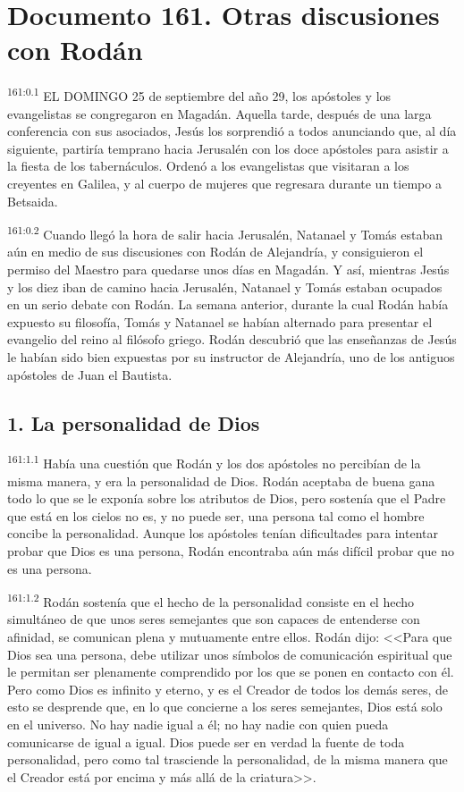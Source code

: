 \chapter{Documento 161. Otras discusiones con Rodán}
\par 
\textsuperscript{161:0.1} EL DOMINGO 25 de septiembre del año 29, los apóstoles y los evangelistas se congregaron en Magadán. Aquella tarde, después de una larga conferencia con sus asociados, Jesús los sorprendió a todos anunciando que, al día siguiente, partiría temprano hacia Jerusalén con los doce apóstoles para asistir a la fiesta de los tabernáculos. Ordenó a los evangelistas que visitaran a los creyentes en Galilea, y al cuerpo de mujeres que regresara durante un tiempo a Betsaida.

\par 
\textsuperscript{161:0.2} Cuando llegó la hora de salir hacia Jerusalén, Natanael y Tomás estaban aún en medio de sus discusiones con Rodán de Alejandría, y consiguieron el permiso del Maestro para quedarse unos días en Magadán. Y así, mientras Jesús y los diez iban de camino hacia Jerusalén, Natanael y Tomás estaban ocupados en un serio debate con Rodán. La semana anterior, durante la cual Rodán había expuesto su filosofía, Tomás y Natanael se habían alternado para presentar el evangelio del reino al filósofo griego. Rodán descubrió que las enseñanzas de Jesús le habían sido bien expuestas por su instructor de Alejandría, uno de los antiguos apóstoles de Juan el Bautista.

\section*{1. La personalidad de Dios}
\par 
\textsuperscript{161:1.1} Había una cuestión que Rodán y los dos apóstoles no percibían de la misma manera, y era la personalidad de Dios. Rodán aceptaba de buena gana todo lo que se le exponía sobre los atributos de Dios, pero sostenía que el Padre que está en los cielos no es, y no puede ser, una persona tal como el hombre concibe la personalidad. Aunque los apóstoles tenían dificultades para intentar probar que Dios es una persona, Rodán encontraba aún más difícil probar que no es una persona.

\par 
\textsuperscript{161:1.2} Rodán sostenía que el hecho de la personalidad consiste en el hecho simultáneo de que unos seres semejantes que son capaces de entenderse con afinidad, se comunican plena y mutuamente entre ellos. Rodán dijo: <<Para que Dios sea una persona, debe utilizar unos símbolos de comunicación espiritual que le permitan ser plenamente comprendido por los que se ponen en contacto con él. Pero como Dios es infinito y eterno, y es el Creador de todos los demás seres, de esto se desprende que, en lo que concierne a los seres semejantes, Dios está solo en el universo. No hay nadie igual a él; no hay nadie con quien pueda comunicarse de igual a igual. Dios puede ser en verdad la fuente de toda personalidad, pero como tal trasciende la personalidad, de la misma manera que el Creador está por encima y más allá de la criatura>>.

